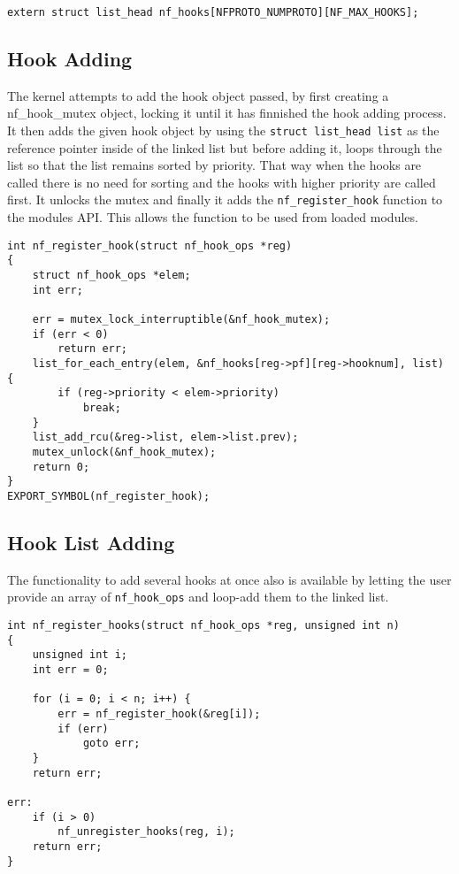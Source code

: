\begin{lstlisting}
extern struct list_head nf_hooks[NFPROTO_NUMPROTO][NF_MAX_HOOKS];
\end{lstlisting}

\subsection{Hook Adding}\label{hook_add}
The kernel attempts to add the hook object passed, by first creating a nf_hook_mutex object, locking it until it has finnished the hook adding process. It then adds the given hook object by using the \verb|struct list_head list| as the reference pointer inside of the linked list but before adding it, loops through the list so that the list remains sorted by priority. That way when the hooks are called there is no need for sorting and the hooks with higher priority are called first. It unlocks the mutex and finally it adds the \verb|nf_register_hook| function to the modules API. This allows the function to be used from loaded modules. 

\begin{lstlisting}
int nf_register_hook(struct nf_hook_ops *reg)
{
	struct nf_hook_ops *elem;
	int err;

	err = mutex_lock_interruptible(&nf_hook_mutex);
	if (err < 0)
		return err;
	list_for_each_entry(elem, &nf_hooks[reg->pf][reg->hooknum], list) {
		if (reg->priority < elem->priority)
			break;
	}
	list_add_rcu(&reg->list, elem->list.prev);
	mutex_unlock(&nf_hook_mutex);
	return 0;
}
EXPORT_SYMBOL(nf_register_hook);
\end{lstlisting}

\subsection{Hook List Adding}\label{hook_list_adding}
The functionality to add several hooks at once also is available by letting the user provide an array of \verb|nf_hook_ops| and loop-add them to the linked list.

\begin{lstlisting}
int nf_register_hooks(struct nf_hook_ops *reg, unsigned int n)
{
	unsigned int i;
	int err = 0;

	for (i = 0; i < n; i++) {
		err = nf_register_hook(&reg[i]);
		if (err)
			goto err;
	}
	return err;

err:
	if (i > 0)
		nf_unregister_hooks(reg, i);
	return err;
}
\end{lstlisting}

